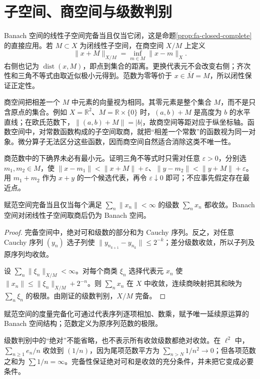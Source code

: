 \section{子空间、商空间与级数判别}
Banach 空间的线性子空间完备当且仅当它闭，这是命题\ref{prop:fa-closed-complete}的直接应用。若 $M\subset X$ 为闭线性子空间，在商空间 $X/M$ 上定义
\begin{equation}
 \|x+M\|_{X/M}=\inf_{m\in M}\|x-m\|_X.
 \label{eq:fa-quotient-norm}
\end{equation}
右侧也记为 $\operatorname{dist}(x,M)$，即点到集合的距离。更换代表元不会改变右侧；齐次性和三角不等式由取近似极小元得到。范数为零等价于 $x\in\overline M=M$，所以闭性保证正定性。

商空间把相差一个 $M$ 中元素的向量视为相同。其零元素是整个集合 $M$，而不是只含原点的集合。例如 $X=\mathbb R^2$、$M=\mathbb R\times\{0\}$ 时，$(a,b)+M$ 是高度为 $b$ 的水平直线；在欧氏范数下，$\|(a,b)+M\|=|b|$，故商空间等距对应于纵坐标轴。函数空间中，对常数函数构成的子空间取商，就把“相差一个常数”的函数视为同一对象。微分算子无法区分这些函数，因而商空间自然适合消除这类不唯一性。

商范数中的下确界未必有最小元。证明三角不等式时只需对任意 $\varepsilon>0$，分别选 $m_1,m_2\in M$，使 $\|x-m_1\|<\|x+M\|+\varepsilon$、$\|y-m_2\|<\|y+M\|+\varepsilon$。用 $m_1+m_2$ 作为 $x+y$ 的一个候选代表，再令 $\varepsilon\downarrow0$ 即可；不应事先假定存在最近点。

\begin{proposition}\label{prop:fa-series-complete}
赋范空间完备当且仅当每个满足 $\sum_n\|x_n\|<\infty$ 的级数 $\sum_nx_n$ 都收敛。Banach 空间对闭线性子空间取商后仍为 Banach 空间。
\end{proposition}
\begin{proof}
完备空间中，绝对可和级数的部分和为 Cauchy 序列。反之，对任意 Cauchy 序列 $(y_n)$ 选子列使 $\|y_{n_{k+1}}-y_{n_k}\|\leq2^{-k}$；差分级数收敛，所以子列及原序列均收敛。

设 $\sum_n\|\xi_n\|_{X/M}<\infty$。对每个商类 $\xi_n$ 选择代表元 $x_n$ 使 $\|x_n\|\leq\|\xi_n\|_{X/M}+2^{-n}$。则 $\sum_nx_n$ 在 $X$ 中收敛，连续商映射把其和映为 $\sum_n\xi_n$ 的极限。由刚证的级数判别，$X/M$ 完备。
\end{proof}
赋范空间的度量完备化可通过代表序列逐项相加、数乘，赋予唯一延续原运算的 Banach 空间结构；范数定义为原序列范数的极限。

级数判别中的“绝对”不能省略，也不表示所有收敛级数都绝对收敛。在 $\ell^2$ 中，$\sum_{n\geq1}e_n/n$ 收敛到 $(1/n)$，因为尾项范数平方为 $\sum_{n>N}1/n^2\to0$；但各项范数之和为 $\sum1/n=\infty$。完备性保证绝对可和是收敛的充分条件，并未把它变成必要条件。

